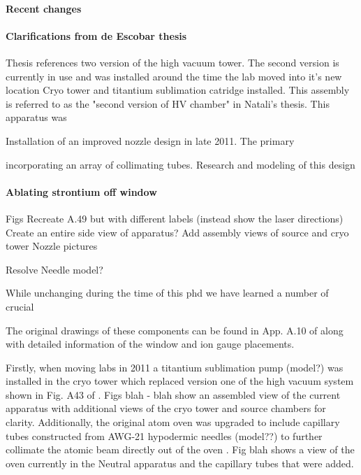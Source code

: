 \paragraph{Recent changes}


\paragraph{Clarifications from de Escobar thesis}

Thesis references two version of the high vacuum tower. The second version is currently in use and was installed around the time the lab moved into it's new location
Cryo tower and titantium sublimation catridge installed. This assembly is referred to as the "second version of HV chamber" in Natali's thesis. This apparatus was 

Installation of an improved nozzle design in late 2011. The primary

 incorporating an array of collimating tubes. Research and modeling of this design 

\paragraph{Ablating strontium off window}




Figs
	Recreate A.49 but with different labels (instead show the laser directions)
	Create an entire side view of apparatus?
	Add assembly views of source and cryo tower
	Nozzle pictures
	
Resolve
	Needle model?


While unchanging during the time of this phd we have learned a number of crucial 




	


The original drawings of these components can be found in App. A.10 of \cite{MartinezdeEscolar2010} along with detailed information of the window and ion gauge placements. 

Firstly, when moving labs in 2011 a titantium sublimation pump (model?) was installed in the cryo tower which replaced version one of the high vacuum system shown in Fig. A43 of \cite{MartinezdeEscolar2010}. 
Figs blah - blah show an assembled view of the current apparatus with additional views of the cryo tower and source chambers for clarity. 
Additionally, the original atom oven was upgraded to include capillary tubes constructed from AWG-21 hypodermic needles (model??) to further collimate the atomic beam directly out of the oven \cite{Mazurenko2010}. Fig blah shows a view of the oven currently in the Neutral apparatus and the capillary tubes that were added.




